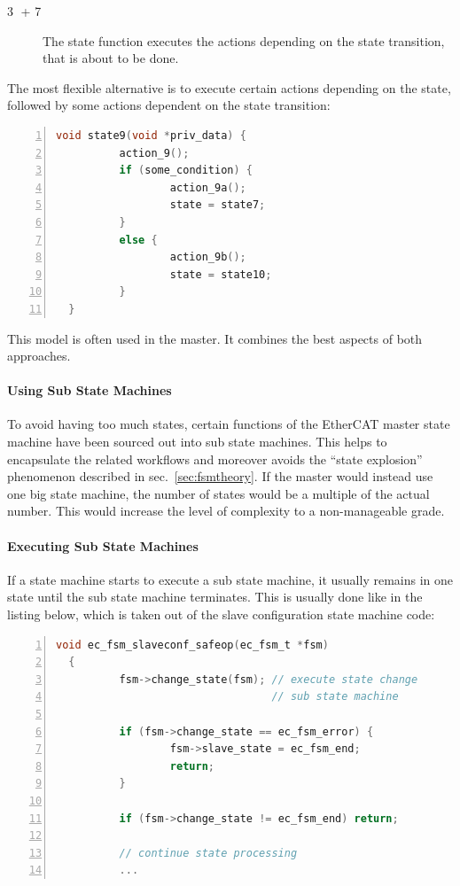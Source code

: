 \documentclass[a4paper,12pt,BCOR6mm,bibtotoc,idxtotoc]{scrbook}
\newcommand{\linenum}[1]{\normalfont\textcircled{\tiny #1}}
\begin{document}
\begin{description}

\item[\linenum{3} + \linenum{7}] The state function executes the actions
depending on the state transition, that is about to be done.

\end{description}

The most flexible alternative is to execute certain actions depending
on the state, followed by some actions dependent on the state
transition:

\begin{lstlisting}[gobble=2,language=C,numbers=left]
  void state9(void *priv_data) {
          action_9();
          if (some_condition) {
                  action_9a();
                  state = state7;
          }
          else {
                  action_9b();
                  state = state10;
          }
  }
\end{lstlisting}

This model is often used in the master. It combines the best aspects of both
approaches.

\paragraph{Using Sub State Machines}

To avoid having too much states, certain functions of the EtherCAT master
state machine have been sourced out into sub state machines.  This helps to
encapsulate the related workflows and moreover avoids the ``state explosion''
phenomenon described in sec.~\ref{sec:fsmtheory}. If the master would instead
use one big state machine, the number of states would be a multiple of the
actual number. This would increase the level of complexity to a non-manageable
grade.

\paragraph{Executing Sub State Machines}

If a state machine starts to execute a sub state machine, it usually
remains in one state until the sub state machine terminates. This is
usually done like in the listing below, which is taken out of the
slave configuration state machine code:

\begin{lstlisting}[gobble=2,language=C,numbers=left]
  void ec_fsm_slaveconf_safeop(ec_fsm_t *fsm)
  {
          fsm->change_state(fsm); // execute state change
                                  // sub state machine

          if (fsm->change_state == ec_fsm_error) {
                  fsm->slave_state = ec_fsm_end;
                  return;
          }

          if (fsm->change_state != ec_fsm_end) return;

          // continue state processing
          ...
\end{lstlisting}
\end{document}
